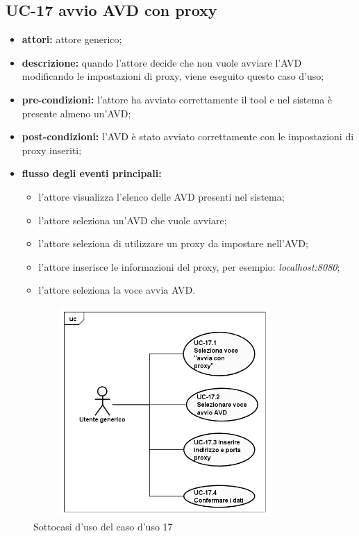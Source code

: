 \subsection*{UC-17 avvio AVD con proxy}\label{subsec:uc-16-avvio-avd-con-proxy}
\begin{itemize}
    \item \textbf{attori:} attore generico;
    \item \textbf{descrizione:} quando l'attore decide che non vuole avviare l'AVD modificando le impostazioni di proxy, viene eseguito questo caso d'uso;
    \item \textbf{pre-condizioni:} l'attore ha avviato correttamente il tool e nel sistema è presente almeno un'AVD;
    \item \textbf{post-condizioni:} l'AVD è stato avviato correttamente con le impostazioni di proxy inseriti;
    \item \textbf{flusso degli eventi principali:}
    \begin{itemize}
        \item l'attore visualizza l'elenco delle AVD presenti nel sistema;
        \item l'attore seleziona un'AVD che vuole avviare;
        \item l'attore seleziona di utilizzare un proxy da impostare nell'AVD;
        \item l'attore inserisce le informazioni del proxy, per esempio: \textit{localhost:8080};
        \item l'attore seleziona la voce avvia AVD.
    \end{itemize}
\end{itemize}
\begin{figure}[H]
    \centering
    \includegraphics[width=10cm, height=8cm]{./immagini/usecase/uc_17.png}
    \caption{Sottocasi d'uso del caso d'uso 17}
\end{figure}
